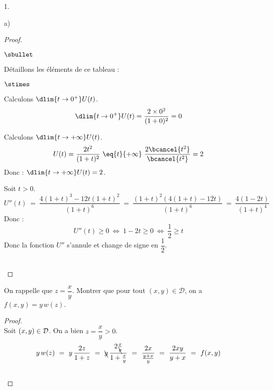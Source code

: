 \documentclass[11pt]{article}%
\begin{document}
\begin{noliste}{1.}
\begin{noliste}{a)}
\begin{proof}
\begin{noliste}{$\sbullet$}
    \begin{center}
     \end{center}
     
     Détaillons les éléments de ce tableau :
     \begin{noliste}{$\stimes$}
      \item Calculons $\dlim{t\to 0^+} U(t)$.
      \[
       \dlim{t\to 0^+} U(t) = \dfrac{2 \times 0^2}{(1+0)^2} = 0
      \]
      \item Calculons $\dlim{t\to +\infty} U(t)$.
      \[
       U(t) = \dfrac{2t^2}{(1+t)^2} \ \eq{t}{+\infty} \ 
       \dfrac{2 \bcancel{t^2}}{\bcancel{t^2}} = 2
      \]
      Donc : $\dlim{t\to +\infty} U(t)=2$.
     \end{noliste}
     
     
     

     \item Soit $t>0$.
     \[
      U''(t) \ = \ \dfrac{4(1+t)^3 - 12t(1+t)^2}{(1+t)^6}
      \ = \ \dfrac{(1+t)^2\left( 4(1+t) -12t\right)}{(1+t)^6}
      \ = \ \dfrac{4(1-2t)}{(1+t)^4}
     \]
     Donc :
     \[
      U''(t) \geq 0 \ \Leftrightarrow \ 1-2t \geq 0 
      \ \Leftrightarrow \ \dfrac{1}{2} \geq t
     \]
     Donc la fonction $U''$ s'annule et change de signe en 
     $\dfrac{1}{2}$.
   \end{noliste}
   ~\\[-1.4cm]
 \end{proof}
  
  \item On rappelle que $z=\dfrac{x}{y}$. Montrer que pour tout $(x,y) 
  \in \mathcal{D}$, on a $f(x,y)=y \, w(z)$.
  
  \begin{proof}~\\
   Soit $(x,y) \in {\cal D}$. On a bien $z=\dfrac{x}{y} >0$.
   \[
    y \, w(z) \ = \ y \, \dfrac{2z}{1+z} \ = \ \bcancel{y} \, 
    \dfrac{2 \frac{x}{\bcancel{y}}}{1+\frac{x}{y}}
    \ = \ \dfrac{2x}{\frac{y+x}{y}} \ = \ \dfrac{2xy}{y+x} \ = \ f(x,y)
   \]
   ~\\[-1cm]
  \end{proof}


\end{noliste}
\end{noliste}
\end{document}
